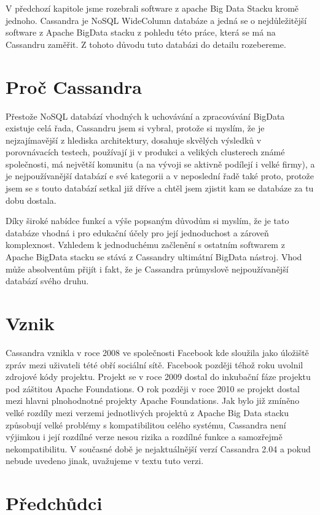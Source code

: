 
V předchozí kapitole jsme rozebrali software z apache Big Data Stacku kromě jednoho. Cassandra je NoSQL WideColumn databáze a jedná se o nejdůležitější software z Apache BigData stacku z pohledu této práce, která se má na Cassandru zaměřit. Z tohoto důvodu tuto databázi do detailu rozebereme. 

\section{Proč Cassandra}
Přestože NoSQL databází vhodných k uchovávání a zpracovávání BigData existuje celá řada, Cassandru jsem si vybral, protože si myslím, že je nejzajímavější z hlediska architektury, dosahuje skvělých výsledků v porovnávacích testech\cite{benchmark}, používají ji v produkci a velikých clusterech známé společnosti, má největší komunitu (a na vývoji se aktivně podílejí i velké firmy), a je nejpoužívanější databází e své kategorii\cite{dbengines} a v neposlední řadě také proto, protože jsem se s touto databází setkal již dříve a chtěl jsem zjistit kam se databáze za tu dobu dostala.

Díky široké nabídce funkcí a výše popsaným důvodům si myslím, že je tato databáze vhodná i pro edukační účely pro její jednoduchost a zároveň komplexnost. Vzhledem k jednoduchému začlenění s ostatním softwarem z Apache BigData stacku se stává z Cassandry ultimátní BigData nástroj. Vhod může absolventům přijít i fakt, že je Cassandra průmyslově nejpoužívanější databází svého druhu.


\section{Vznik}

Cassandra vznikla v roce 2008 ve společnosti Facebook kde sloužila jako úložiště zpráv mezi uživateli tété obří sociální sítě. Facebook později téhož roku uvolnil zdrojové kódy projektu. Projekt se v roce 2009 dostal do inkubační fáze projektu pod záštitou Apache Foundations. O rok později v roce 2010 se projekt dostal mezi hlavni plnohodnotné projekty Apache Foundations. Jak bylo již zmíněno velké rozdíly mezi verzemi jednotlivých projektů z Apache Big Data stacku způsobují velké problémy s kompatibilitou celého systému, Cassandra není výjimkou i její rozdílné verze nesou rizika a rozdílné funkce a samozřejmě nekompatibilitu. V současné době je nejaktuálnější verzí Cassandra 2.04 a pokud nebude uvedeno jinak, uvažujeme v textu tuto verzi. 

\section{Předchůdci}

